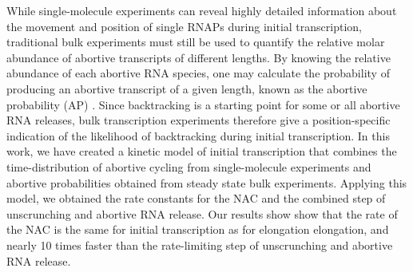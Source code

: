 While single-molecule experiments can reveal highly detailed information about
the movement and position of single RNAPs during initial transcription,
traditional bulk experiments must still be used to quantify the relative molar
abundance of abortive transcripts of different lengths. By knowing the
relative abundance of each abortive RNA species, one may calculate the
probability of producing an abortive transcript of a given length, known as
the abortive probability (AP) \cite{hsu_promoter_2002, hsu_quantitative_1996}.
Since backtracking is a starting point for some or all abortive RNA releases,
bulk transcription experiments therefore give a position-specific indication
of the likelihood of backtracking during initial transcription. In this work,
we have created a kinetic model of initial transcription that combines the
time-distribution of abortive cycling from single-molecule experiments and
abortive probabilities obtained from steady state bulk experiments. Applying
this model, we obtained the rate constants for the NAC and the combined step
of unscrunching and abortive RNA release. Our results show show that the rate
of the NAC is the same for initial transcription as for elongation elongation,
and nearly 10 times faster than the rate-limiting step of unscrunching and
abortive RNA release.

